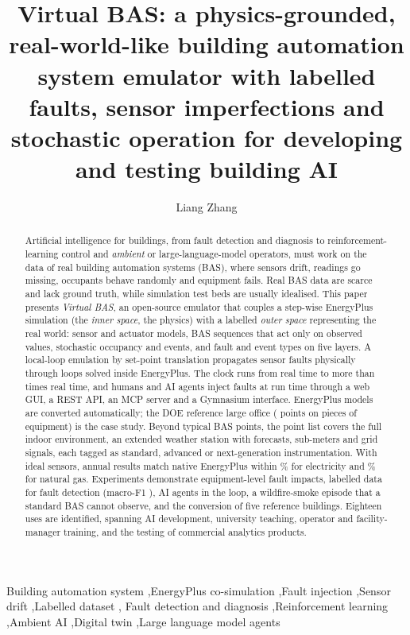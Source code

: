 \documentclass[preprint,12pt,authoryear=false]{elsarticle}
\begin{document}
\begin{frontmatter}

\title{Virtual BAS: a physics-grounded, real-world-like building automation system emulator with labelled faults, sensor imperfections and stochastic operation for developing and testing building AI}

\author{Liang Zhang}

\begin{abstract}
Artificial intelligence for buildings, from fault detection and diagnosis to reinforcement-learning control and
\emph{ambient} or large-language-model operators, must work on the data of real building automation systems (BAS),
where sensors drift, readings go missing, occupants behave randomly and equipment fails. Real BAS data are scarce and
lack ground truth, while simulation test beds are usually idealised. This paper presents \emph{Virtual BAS}, an
open-source emulator that couples a step-wise EnergyPlus simulation (the \emph{inner space}, the physics) with a
labelled \emph{outer space} representing the real world: sensor and actuator models, BAS sequences that act only on
observed values, stochastic occupancy and events, and \NumFaultTypes{} fault and event types on five layers. A
local-loop emulation by set-point translation propagates sensor faults physically through loops solved inside
EnergyPlus. The clock runs from real time to more than \SpeedMaxK{} times real time, and humans and AI agents inject
faults at run time through a web GUI, a REST API, an MCP server and a Gymnasium interface. EnergyPlus models are
converted automatically; the DOE reference large office (\NumPoints{} points on \NumEquip{} pieces of equipment) is
the case study. Beyond typical BAS points, the point list covers the full indoor environment, an extended weather
station with forecasts, sub-meters and grid signals, each tagged as standard, advanced or next-generation
instrumentation. With ideal sensors, annual results match native EnergyPlus within \ValElecDiffAbs\% for electricity
and \ValGasDiffAbs\% for natural gas. Experiments demonstrate equipment-level fault impacts, labelled data for fault
detection (macro-F1 \FddDetF{}), AI agents in the loop, a wildfire-smoke episode that a standard BAS cannot observe,
and the conversion of five reference buildings. Eighteen uses are identified, spanning AI development, university
teaching, operator and facility-manager training, and the testing of commercial analytics products.
\end{abstract}

\begin{keyword}
Building automation system \sep EnergyPlus co-simulation \sep Fault injection \sep Sensor drift \sep Labelled dataset \sep
Fault detection and diagnosis \sep Reinforcement learning \sep Ambient AI \sep Digital twin \sep Large language model agents
\end{keyword}

\end{frontmatter}
\end{document}
